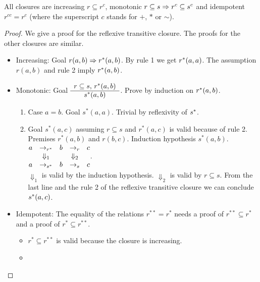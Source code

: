 \begin{theorem}
  All closures are increasing $r \subseteq r^c$, monotonic
  $r \subseteq s \Rightarrow r^c \subseteq s^c$ and idempotent $r^{cc} = r^c$ (where
  the superscript $c$ stands for $+$, $*$ or $\sim$).
  \begin{proof}  We give a proof for the reflexive transitive closure. The
    proofs for the other closures are similar.
    \begin{itemize}
    \item
      Increasing: Goal $r(a,b) \Rightarrow r^*(a,b)$. By rule 1 we get
      $r^*(a,a)$. The assumption $r(a,b)$ and rule 2 imply
      $r^*(a,b)$.
    \item
      Monotonic: Goal $\begin{array}{c} r \subseteq s, \, r^*(a,b) \\ \hline s^*(a,b)\end{array}$. Prove by induction on $r^*(a,b)$.
        \begin{enumerate}
        \item Case $a=b$. Goal $s^*(a,a)$. Trivial by reflexivity of $s^*$.
        \item
          Goal $s^*(a,c)$ assuming $r\subseteq s$ and $r^*(a,c)$ is valid
          because of rule 2. Premises $r^*(a,b)$ and $r(b,c)$. Induction
          hypothesis $s^*(a,b)$.
          \\
          $
          \begin{matrix}
            a  & \to_{r^*} & b   &  \to_r   & c \\
                &    \Downarrow_1 & &  \Downarrow_2\\
            a  & \to_{s^*} & b   &  \to_s  &  c
          \end{matrix}$.\\
          $\Downarrow_1$ is valid by the induction
          hypothesis. $\Downarrow_2$ is valid by $r \subseteq s$. From the
          last line and the rule 2 of the reflexive transitive closure we can
          conclude $s^*(a,c)$.
        \end{enumerate}
    \item
      Idempotent: The equality of the relations $r^{**} = r^*$ needs a proof
      of $r^{**} \subseteq r^*$ and a proof of $r^* \subseteq r^{**}$.
      \begin{itemize}
      \item $ r^* \subseteq r^{**}$ is valid because the
        closure is increasing.
      \item

\end{itemize}
\end{itemize}
\end{proof}
\end{theorem}
